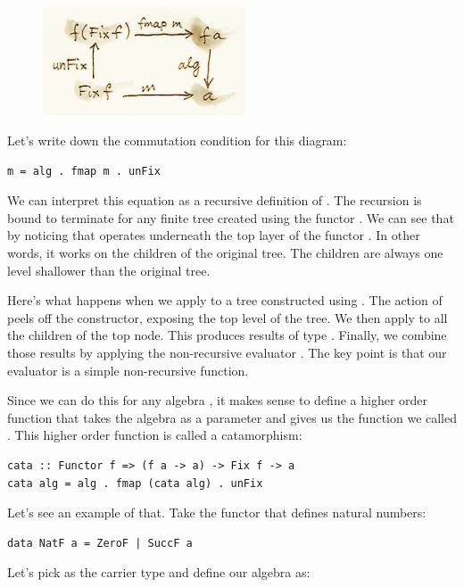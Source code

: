 \begin{figure}[H]
\centering
\includegraphics[width=60mm]{images/alg6.png}
\end{figure}

\noindent
Let's write down the commutation condition for this diagram:

\begin{Verbatim}[commandchars=\\\{\}]
m = alg . fmap m . unFix
\end{Verbatim}
We can interpret this equation as a recursive definition of .
The recursion is bound to terminate for any finite tree created using
the functor . We can see that by noticing that
 operates underneath the top layer of the functor
. In other words, it works on the children of the original
tree. The children are always one level shallower than the original
tree.

Here's what happens when we apply  to a tree constructed using
. The action of  peels off the constructor,
exposing the top level of the tree. We then apply  to all the
children of the top node. This produces results of type .
Finally, we combine those results by applying the non-recursive
evaluator . The key point is that our evaluator 
is a simple non-recursive function.

Since we can do this for any algebra , it makes sense to
define a higher order function that takes the algebra as a parameter and
gives us the function we called . This higher order function
is called a catamorphism:

\begin{Verbatim}[commandchars=\\\{\}]
cata :: Functor f => (f a -> a) -> Fix f -> a
cata alg = alg . fmap (cata alg) . unFix
\end{Verbatim}
Let's see an example of that. Take the functor that defines natural
numbers:

\begin{Verbatim}[commandchars=\\\{\}]
data NatF a = ZeroF | SuccF a
\end{Verbatim}
Let's pick  as the carrier type and define our
algebra as:

